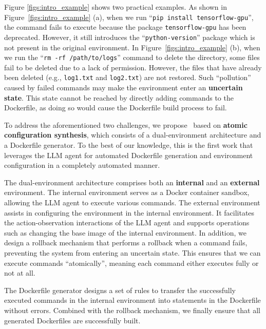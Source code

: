 Figure \ref{figs:intro_example} shows two practical examples.
As shown in Figure~\ref{figs:intro_example} (a), when we run ``\texttt{pip install tensorflow-gpu}'', the command fails to execute because the package \texttt{tensorflow-gpu} has been deprecated. However, it still introduces the ``\texttt{python-version}'' package which is not present in the original environment. In Figure~\ref{figs:intro_example} (b), when we run the ``\texttt{rm -rf /path/to/logs}'' command to delete the directory, some files fail to be deleted due to a lack of permission. However, the files that have already been deleted (e.g., \texttt{log1.txt} and \texttt{log2.txt}) are not restored. Such ``pollution'' caused by failed commands may make the environment enter an \textbf{uncertain state}. This state cannot be reached by directly adding commands to the Dockerfile, as doing so would cause the Dockerfile build process to fail.

To address the aforementioned two challenges, we propose \textbf{\tool}~based on \textbf{atomic configuration synthesis}, which consists of a dual-environment architecture and a Dockerfile generator. To the best of our knowledge, this is the first work that leverages the LLM agent for automated Dockerfile generation and environment configuration in a completely automated manner.

The dual-environment architecture comprises both an \textbf{internal} and an \textbf{external} environment. The internal environment serves as a Docker container sandbox, allowing the LLM agent to execute various commands. The external environment assists in configuring the environment in the internal environment. It facilitates the action-observation interactions of the LLM agent and supports operations such as changing the base image of the internal environment. 
In addition, we design a rollback mechanism that performs a rollback when a command fails, preventing the system from entering an uncertain state. This ensures that we can execute commands ``atomically'', meaning each command either executes fully or not at all.

The Dockerfile generator designs a set of rules to transfer the successfully executed commands in the internal environment into statements in the Dockerfile without errors. Combined with the rollback mechanism, we finally ensure that all generated Dockerfiles are successfully built.


